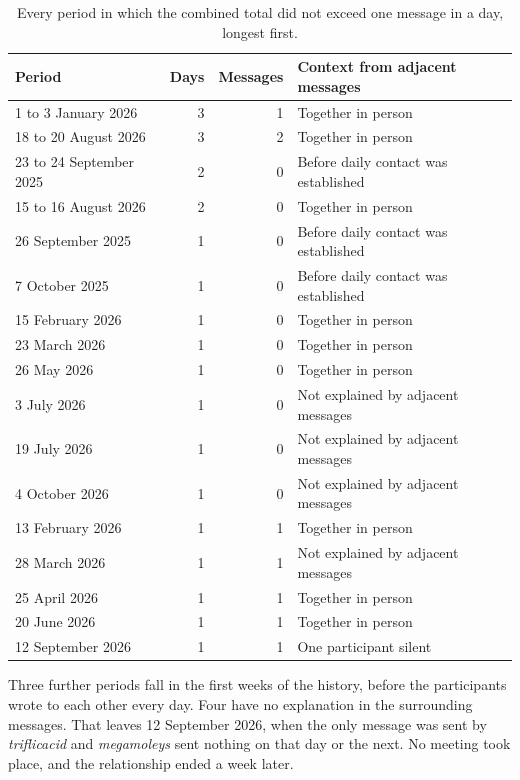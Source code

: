 \documentclass[11pt,a4paper]{article}
\newcommand{\userA}{\textit{triflicacid}}
\newcommand{\userB}{\textit{megamoleys}}
\begin{document}
\begin{table}[H]
  \centering
  \small
  \begin{tabular}{lrrl}
    \toprule
    Period & Days & Messages & Context from adjacent messages \\
    \midrule
    1 to 3 January 2026 & 3 & 1 & Together in person \\
    18 to 20 August 2026 & 3 & 2 & Together in person \\
    23 to 24 September 2025 & 2 & 0 & Before daily contact was established \\
    15 to 16 August 2026 & 2 & 0 & Together in person \\
    26 September 2025 & 1 & 0 & Before daily contact was established \\
    7 October 2025 & 1 & 0 & Before daily contact was established \\
    15 February 2026 & 1 & 0 & Together in person \\
    23 March 2026 & 1 & 0 & Together in person \\
    26 May 2026 & 1 & 0 & Together in person \\
    3 July 2026 & 1 & 0 & Not explained by adjacent messages \\
    19 July 2026 & 1 & 0 & Not explained by adjacent messages \\
    4 October 2026 & 1 & 0 & Not explained by adjacent messages \\
    13 February 2026 & 1 & 1 & Together in person \\
    28 March 2026 & 1 & 1 & Not explained by adjacent messages \\
    25 April 2026 & 1 & 1 & Together in person \\
    20 June 2026 & 1 & 1 & Together in person \\
    12 September 2026 & 1 & 1 & One participant silent \\
    \bottomrule
  \end{tabular}
  \caption{Every period in which the combined total did not exceed one message in a
  day, longest first.}
  \label{tab:quiet}
\end{table}

Three further periods fall in the first weeks of the history, before the participants
wrote to each other every day. Four have no explanation in the surrounding messages.
That leaves 12 September 2026, when the only message was sent by \userA{} and \userB{}
sent nothing on that day or the next. No meeting took place, and the relationship
ended a week later.
\end{document}

